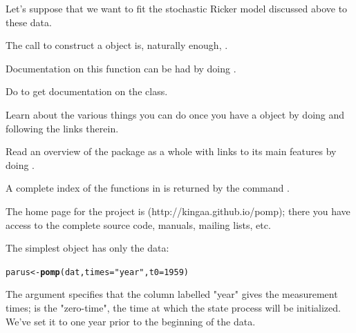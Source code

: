 \documentclass{beamer}\usepackage[]{graphicx}\usepackage[]{color}
\makeatletter
\newcommand{\hlnum}[1]{\textcolor[rgb]{0.686,0.059,0.569}{#1}}%
\newcommand{\hlstr}[1]{\textcolor[rgb]{0.192,0.494,0.8}{#1}}%
\newcommand{\hlstd}[1]{\textcolor[rgb]{0.345,0.345,0.345}{#1}}%
\newcommand{\hlkwb}[1]{\textcolor[rgb]{0.69,0.353,0.396}{#1}}%
\newcommand{\hlkwc}[1]{\textcolor[rgb]{0.333,0.667,0.333}{#1}}%
\newcommand{\hlkwd}[1]{\textcolor[rgb]{0.737,0.353,0.396}{\textbf{#1}}}%
\newenvironment{kframe}{%
 \def\at@end@of@kframe{}%
 \ifinner\ifhmode%
  \def\at@end@of@kframe{\end{minipage}}%
  \begin{minipage}{\columnwidth}%
 \fi\fi%
 \def\FrameCommand##1{\hskip\@totalleftmargin \hskip-\fboxsep
 \colorbox{shadecolor}{##1}\hskip-\fboxsep
     \hskip-\linewidth \hskip-\@totalleftmargin \hskip\columnwidth}%
 \MakeFramed {\advance\hsize-\width
   \@totalleftmargin\z@ \linewidth\hsize
   \@setminipage}}%
 {\par\unskip\endMakeFramed%
 \at@end@of@kframe}
\newenvironment{knitrout}{}{} %
\makeatother
\begin{document}
\begin{frame}[fragile]
Let's suppose that we want to fit the stochastic Ricker model discussed above to these data.
\bi
\item The call to construct a  object is, naturally enough, .
\item Documentation on this function can be had by doing . 
\item Do  to get documentation on the  class.
\item Learn about the various things you can do once you have a  object by doing  and following the links therein.
\item Read an overview of the package as a whole with links to its main features by doing .
\item A complete index of the functions in  is returned by the command .
\item The home page for the  project is (http://kingaa.github.io/pomp);
there you have access to the complete source code, manuals, mailing lists, etc.
\ei

\end{frame}

\begin{frame}[fragile]

The simplest  object has only the data:
\begin{knitrout}\small
{}\color{fgcolor}\begin{kframe}
\begin{alltt}
\hlstd{parus} \hlkwb{<-} \hlkwd{pomp}\hlstd{(dat,}\hlkwc{times}\hlstd{=}\hlstr{"year"}\hlstd{,}\hlkwc{t0}\hlstd{=}\hlnum{1959}\hlstd{)}
\end{alltt}
\end{kframe}
\end{knitrout}
The  argument specifies that the column labelled "year" gives the measurement times;
 is the "zero-time", the time at which the state process will be initialized.
We've set it to one year prior to the beginning of the data.
\end{frame}
\end{document}
